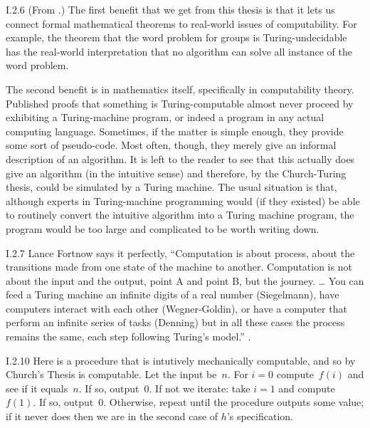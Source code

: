 \begin{ans}{I.2.6}
(From \autocite{blass}.)
The first benefit that we get from this thesis is that it lets us
connect formal mathematical theorems to real-world issues of computability.
For example, the theorem that the word problem for groups is Turing-undecidable
has the real-world interpretation that no algorithm can solve all instance of
the word problem.

The second benefit is in mathematics itself, specifically in computability
theory.
Published proofs that something is Turing-computable almost never proceed by
exhibiting a Turing-machine program, or indeed a program in any actual
computing language.
Sometimes, if the matter is simple enough, they provide some sort of
pseudo-code.
Most often, though, they merely give an informal description of an algorithm.
It is left to the reader to see that this actually does give an algorithm
(in the intuitive sense) and therefore, by the Church-Turing thesis, could be
simulated by a Turing machine.
The usual situation is that, although experts in Turing-machine programming
would (if they existed) be able to routinely convert the intuitive algorithm
into a Turing machine program, the program would be too large and
complicated to be worth writing down.
\end{ans}
%
\begin{ans}{I.2.7}
Lance Fortnow says it perfectly,
``Computation is about process, about the transitions made from one state
of the machine to another. Computation is not about the input and the output,
point A and point B, but the journey. \ldots{}
You can feed a Turing machine an infinite digits of a real number
(Siegelmann), have computers interact with each other (Wegner-Goldin),
or have a computer that perform an infinite series of tasks (Denning) but
in all these cases the process remains the same, each step following
Turing's model.''
\autocite{Fortnow10}.
\end{ans}
%
%
%
\begin{ans}{I.2.10}
Here is a procedure that is intutively mechanically
computable, and so by Church's Thesis is computable.
Let the input be~$n$.
For $i=0$ compute~$f(i)$ and see if it equals~$n$.
If so, output~$0$.
If not we iterate: take $i=1$ and compute $f(1)$.
If so, output~$0$.
Otherwise, repeat until the procedure outputs some value;
if it never does then we are in the second case of $h$'s specification.
\end{ans}
